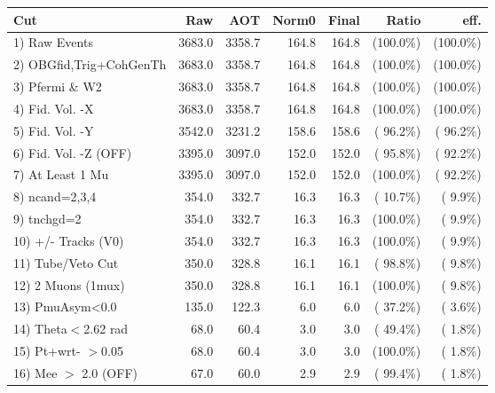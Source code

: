  \begin{table}[h!]\centering
 \begin{tabular}{||l||r|r|r|r|r|r||}
 \hline
 \hline
 Cut & Raw & AOT & Norm0 & Final & Ratio & eff.       \\
 \hline
  1) Raw Events           &       3683.0 &       3358.7 &        164.8 &        164.8 & (100.0\%) & (100.0\%) \\
  2) OBGfid,Trig+CohGenTh &       3683.0 &       3358.7 &        164.8 &        164.8 & (100.0\%) & (100.0\%) \\
  3) Pfermi \& W2         &       3683.0 &       3358.7 &        164.8 &        164.8 & (100.0\%) & (100.0\%) \\
  4) Fid. Vol. -X         &       3683.0 &       3358.7 &        164.8 &        164.8 & (100.0\%) & (100.0\%) \\
  5) Fid. Vol. -Y         &       3542.0 &       3231.2 &        158.6 &        158.6 & ( 96.2\%) & ( 96.2\%) \\
  6) Fid. Vol. -Z (OFF)   &       3395.0 &       3097.0 &        152.0 &        152.0 & ( 95.8\%) & ( 92.2\%) \\
  7) At Least 1 Mu        &       3395.0 &       3097.0 &        152.0 &        152.0 & (100.0\%) & ( 92.2\%) \\
  8) ncand=2,3,4          &        354.0 &        332.7 &         16.3 &         16.3 & ( 10.7\%) & (  9.9\%) \\
  9) tnchgd=2             &        354.0 &        332.7 &         16.3 &         16.3 & (100.0\%) & (  9.9\%) \\
 10) +/- Tracks (V0)      &        354.0 &        332.7 &         16.3 &         16.3 & (100.0\%) & (  9.9\%) \\
 11) Tube/Veto Cut        &        350.0 &        328.8 &         16.1 &         16.1 & ( 98.8\%) & (  9.8\%) \\
 12) 2 Muons (1mux)       &        350.0 &        328.8 &         16.1 &         16.1 & (100.0\%) & (  9.8\%) \\
 13) PmuAsym<0.0          &        135.0 &        122.3 &          6.0 &          6.0 & ( 37.2\%) & (  3.6\%) \\
 14) Theta$<$2.62 rad     &         68.0 &         60.4 &          3.0 &          3.0 & ( 49.4\%) & (  1.8\%) \\
 15) Pt+wrt- $>$0.05      &         68.0 &         60.4 &          3.0 &          3.0 & (100.0\%) & (  1.8\%) \\
 16) Mee $>$ 2.0  (OFF)   &         67.0 &         60.0 &          2.9 &          2.9 & ( 99.4\%) & (  1.8\%) \\

\end{tabular}
\end{table}
